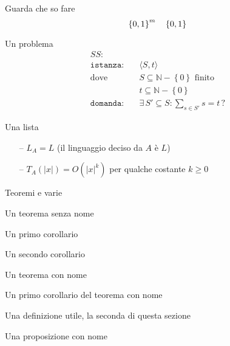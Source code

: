 Guarda che so fare
\begin{equation*}
    \left\{0,1\right\}^{m}
    \quad
    \left\{0,1\right\}^{}
\end{equation*}

Un problema
\begin{align*}
    SS: & \\
    \texttt{istanza:} \quad & \langle S,t \rangle \\
    \text{dove} \quad & S \subseteq \mathbb{N} - \left\{ 0 \right\} \text{ finito} \\
    & t \subseteq \mathbb{N} - \left\{ 0 \right\} \\
    \texttt{domanda:} \quad & \exists \, S' \subseteq S : \sum_{s \in S'}^{} s = t \, ?
\end{align*}

Una lista
\begin{itemize}[noitemsep,parsep=0pt,partopsep=0pt,topsep=0pt]
    \item[--] $L_A = L$ (il linguaggio deciso da $A$ è $L$)
    \item[--] $T_A(|x|) = O(|x|^k)$ per qualche costante $k \geq 0$
\end{itemize}

Teoremi e varie

\begin{theorem}
    Un teorema senza nome
\end{theorem}

\begin{corollario}
    Un primo corollario
\end{corollario}

\begin{corollario}
    Un secondo corollario
\end{corollario}

\begin{theorem}
    Un teorema con nome
\end{theorem}

\begin{corollario}
    Un primo corollario del teorema con nome
\end{corollario}

\begin{definition}
    Una definizione utile, la seconda di questa sezione
\end{definition}

\begin{proposizione}
    Una proposizione con nome
\end{proposizione}

